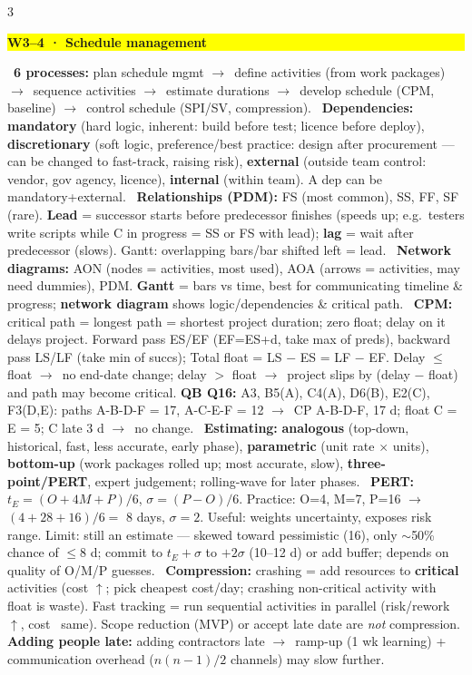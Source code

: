 \documentclass[a4paper,landscape]{article}
\newcommand{\hlhighlight}[1]{\begingroup\setlength{\fboxsep}{0pt}\colorbox{yellow}{\strut\textbf{#1}}\endgroup}
\newcommand{\concept}[1]{\textbf{#1}}
\newcommand{\lbl}[1]{\textbf{#1}}
\newcommand{\kh}[1]{{\setlength{\fboxsep}{0.5pt}\colorbox{keyhlcolor}{#1}}}
\newcommand{\ra}{$\rightarrow$}
\begin{document}
\begin{multicols}{3}
\par\smallskip\noindent\hlhighlight{W3--4 · Schedule management}\ \concept{6 processes:} plan schedule mgmt \ra\ define activities (from work packages) \ra\ sequence activities \ra\ estimate durations \ra\ develop schedule (CPM, baseline) \ra\ control schedule (SPI/SV, compression). \textbullet\ \concept{Dependencies:} \lbl{mandatory} (hard logic, inherent: build before test; licence before deploy), \lbl{discretionary} (soft logic, preference/best practice: design after procurement --- can be changed to fast-track, raising risk), \lbl{external} (outside team control: vendor, gov agency, licence), \lbl{internal} (within team). A dep can be mandatory+external. \textbullet\ \concept{Relationships (PDM):} FS (most common), SS, FF, SF (rare). \concept{Lead} = successor starts before predecessor finishes (speeds up; e.g.\ testers write scripts while C in progress = SS or FS with lead); \concept{lag} = wait after predecessor (slows). Gantt: overlapping bars/bar shifted left = lead. \textbullet\ \concept{Network diagrams:} AON (nodes = activities, most used), AOA (arrows = activities, may need dummies), PDM. \concept{Gantt} = bars vs time, best for communicating timeline \& progress; \lbl{network diagram} shows logic/dependencies \& critical path. \textbullet\ \concept{CPM:} \kh{critical path = longest path} = shortest project duration; \kh{zero float}; delay on it delays project. Forward pass ES/EF (EF=ES+d, take max of preds), backward pass LS/LF (take min of succs); \kh{Total float = LS $-$ ES = LF $-$ EF}. Delay $\le$ float \ra\ no end-date change; delay $>$ float \ra\ project slips by (delay $-$ float) and path may become critical. \lbl{QB Q16:} A3, B5(A), C4(A), D6(B), E2(C), F3(D,E): paths A-B-D-F = 17, A-C-E-F = 12 \ra\ \kh{CP A-B-D-F, 17 d}; float C = E = 5; C late 3 d \ra\ no change. \textbullet\ \concept{Estimating:} \lbl{analogous} (top-down, historical, fast, less accurate, early phase), \lbl{parametric} (unit rate $\times$ units), \lbl{bottom-up} (work packages rolled up; most accurate, slow), \lbl{three-point/PERT}, expert judgement; rolling-wave for later phases. \textbullet\ \concept{PERT:} \kh{$t_E=(O+4M+P)/6$}, $\sigma=(P-O)/6$. Practice: O=4, M=7, P=16 \ra\ $(4+28+16)/6=$ \kh{8 days}, $\sigma=2$. Useful: weights uncertainty, exposes risk range. Limit: still an estimate --- skewed toward pessimistic (16), only $\sim$50\% chance of $\le$8 d; commit to $t_E+\sigma$ to $+2\sigma$ (10--12 d) or add buffer; depends on quality of O/M/P guesses. \textbullet\ \concept{Compression:} \kh{crashing} = add resources to \lbl{critical} activities (cost $\uparrow$; pick cheapest cost/day; crashing non-critical activity with float is waste). \kh{Fast tracking} = run sequential activities in parallel (risk/rework $\uparrow$, cost ~same). Scope reduction (MVP) or accept late date are \emph{not} compression. \lbl{Adding people late:} adding contractors late \ra\ ramp-up (1 wk learning) + communication overhead ($n(n-1)/2$ channels) may slow further.\par


\end{multicols}
\end{document}
